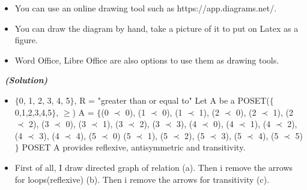 \documentclass[a4 paper]{article}
\numberwithin{equation}{section}
\newcommand{\solution}{~\newline\textbf{\textit{(Solution)}} }
\newcommand{\0}{\mathbf{0}}
\begin{document}
\begin{itemize}
	\item You can use an online drawing tool such as https://app.diagrams.net/.
	\item You can draw the diagram by hand, take a picture of it to put on Latex as a figure.
	\item Word Office, Libre Office are also options to use them as drawing tools. 
\end{itemize}
\solution
\begin{itemize}
	\item $\{$0, 1, 2, 3, 4, 5$\}$, R = "greater than or equal to" \newline \newline
	       Let A be a POSET($\{$0,1,2,3,4,5$\}$, $\geq$) \newline \newline
	       A = $\{$(0 $\prec$ 0), (1 $\prec$ 0), (1 $\prec$ 1), (2 $\prec$ 0), (2 $\prec$ 1), (2 $\prec$ 2), (3 $\prec$ 0), (3 $\prec$ 1), (3 $\prec$ 2), (3 $\prec$ 3), \newline
	       (4 $\prec$ 0), (4 $\prec$ 1), (4 $\prec$ 2), (4 $\prec$ 3), (4 $\prec$ 4), (5 $\prec$ 0) (5 $\prec$ 1), (5 $\prec$ 2), (5 $\prec$ 3), (5 $\prec$ 4), (5 $\prec$ 5)$\}$ \newline \newline
	       POSET A provides reflexive, antisymmetric and transitivity.
	\item First of all, I draw directed graph of relation (a). Then i remove the arrows for loops(reflexive) (b). Then i remove the arrows for transitivity (c).
	\begin{figure}[h]
        \centering
        \begin{subfigure}[b]{0.3\textwidth}

\end{subfigure}
\end{figure}
\end{itemize}
\end{document}
